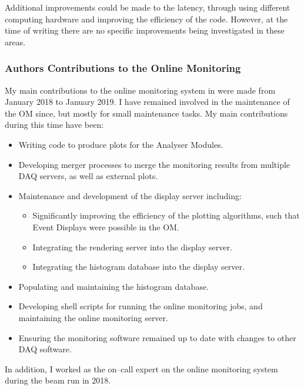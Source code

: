 Additional improvements could be made to the latency, through using different
computing hardware and improving the efficiency of the code. However, at the
time of writing there are no specific improvements being investigated in these
areas.

\subsubsection*{Authors Contributions to the \protodune{} Online Monitoring}
My main contributions to the online monitoring system in \protodune{} were made
from January 2018 to January 2019. I have remained involved in the maintenance 
of the OM since, but mostly for small maintenance tasks. My main contributions 
during this time have been:
\begin{itemize}
	\item Writing code to produce plots for the Analyser Modules.
	\item Developing merger processes to merge the monitoring results from
		multiple DAQ servers, as well as external plots.
	\item Maintenance and development of the display server including:
	\begin{itemize}
		\item Significantly improving the efficiency of the plotting algorithms,
			such that Event Displays were possible in the OM.
		\item Integrating the rendering server into the display server.
		\item Integrating the histogram database into the display server.
	\end{itemize}
	\item Populating and maintaining the histogram database.
	\item Developing shell scripts for running the online monitoring jobs, and
		maintaining the online monitoring server.
	\item Ensuring the monitoring software remained up to date with changes to
		other DAQ software.
\end{itemize}
In addition, I worked as the on--call expert on the online monitoring system
during the \protodune{} beam run in 2018.

